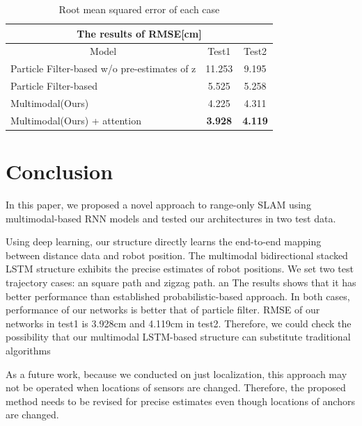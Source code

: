 \documentclass[letterpaper, 10 pt, conference]{ieeeconf}  %
\begin{document}
 \begin{table}[h]
 	\begin{tabular}{lllcc}
 		\hline
 		\multicolumn{5}{c}{The results of RMSE{[}cm{]}}                                                                          \\ \hline
 		\multicolumn{3}{c|}{Model}                                        & \multicolumn{1}{c|}{Test1}          & Test2          \\ \hline
 		\multicolumn{3}{l|}{Particle Filter-based w/o pre-estimates of z} & \multicolumn{1}{c|}{11.253}         & 9.195          \\
 		\multicolumn{3}{l|}{Particle Filter-based}                        & \multicolumn{1}{c|}{5.525}          & 5.258          \\
 		\multicolumn{3}{l|}{Multimodal(Ours)}                                   & \multicolumn{1}{c|}{4.225}          & 4.311          \\
 		\multicolumn{3}{l|}{Multimodal(Ours) + attention}                       & \multicolumn{1}{c|}{\textbf{3.928}} & \textbf{4.119}
 	\end{tabular}
 	\caption{Root mean squared error of each case}
 	\label{table:RMSE_table}
 \end{table}



\section{Conclusion}

In this paper, we proposed a novel approach to range-only SLAM using multimodal-based RNN models and tested our architectures in two test data.

Using deep learning, our structure directly learns the end-to-end mapping between distance data and robot position. The multimodal bidirectional stacked LSTM structure exhibits the precise estimates of robot positions. We set two test trajectory cases: an square path and zigzag path. an The results shows that it has better performance than established probabilistic-based approach. In both cases, performance of our networks  is better that of particle filter. RMSE of our networks in test1 is 3.928cm and 4.119cm in test2. Therefore, we could check the possibility that our multimodal LSTM-based structure can substitute traditional algorithms

As a future work, because we conducted on just localization, this approach may not be operated when locations of sensors are changed. Therefore, the proposed method needs to be revised for precise estimates even though locations of anchors are changed. 
\end{document}
